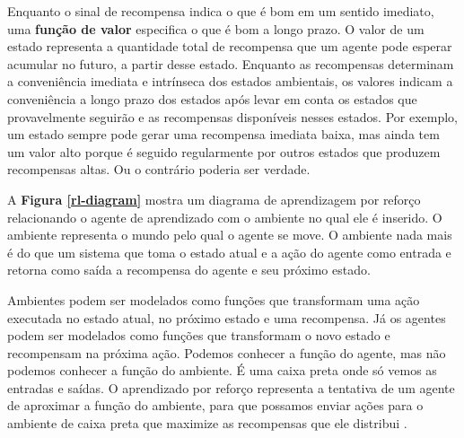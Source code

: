  Enquanto o sinal de recompensa indica o que é bom em um sentido imediato, uma \textbf{função de valor} especifica o que é bom a longo prazo. 
 O valor de um estado representa a quantidade total de recompensa que um agente pode esperar acumular no futuro, a partir desse estado. 
 Enquanto as recompensas determinam a conveniência imediata e intrínseca dos estados ambientais, os valores indicam a conveniência a longo prazo dos estados após levar em conta os estados que provavelmente seguirão e as recompensas disponíveis nesses estados. 
 Por exemplo, um estado sempre pode gerar uma recompensa imediata baixa, mas ainda tem um valor alto porque é seguido regularmente por outros estados que produzem recompensas altas. Ou o contrário poderia ser verdade. 

 A \textbf{Figura \ref{rl-diagram}} mostra um diagrama de aprendizagem por reforço relacionando o agente de aprendizado com o ambiente no qual ele é inserido.
 O ambiente representa o mundo pelo qual o agente se move. O ambiente nada mais é do que um sistema que toma o estado atual e a ação do agente como entrada e retorna como saída a recompensa do agente e seu próximo estado. 

 Ambientes podem ser modelados como funções que transformam uma ação executada no estado atual, no próximo estado e uma recompensa. Já os agentes podem ser modelados como funções que transformam o novo estado e recompensam na próxima ação. 
 Podemos conhecer a função do agente, mas não podemos conhecer a função do ambiente. É uma caixa preta onde só vemos as entradas e saídas. 
 O aprendizado por reforço representa a tentativa de um agente de aproximar a função do ambiente, para que possamos enviar ações para o ambiente de caixa preta que maximize as recompensas que ele distribui \cite{beg-guide-rl}.

